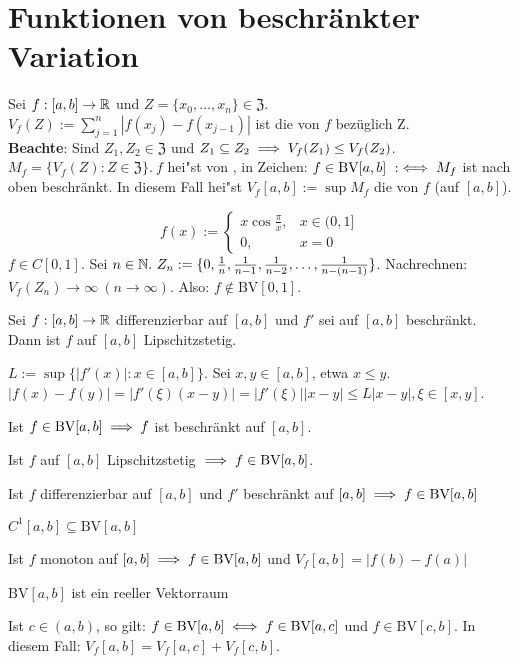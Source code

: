 \documentclass[a4paper,oneside,DIV15,BCOR12mm]{scrbook}
\begin{document}
\def\Z{\ensuremath{\mathfrak{Z}}}
\def\hin{\item["`$\Rightarrow$"':]}
\def\zurueck{\item["`$\Leftarrow$"':]}
\def\BV{\text{BV}}
\def\dx{\text{d}x}

\chapter{Funktionen von beschränkter Variation}

\begin{definition}
Sei $f:[a,b]\to\mathbb{R}$ und $Z=\{x_0,\ldots,x_n\} \in\Z$. $V_f(Z):=\sum_{j=1}^n|f(x_j)-f(x_{j-1})|$ ist die  von $f$ bezüglich Z.\\
\textbf{Beachte}: Sind $Z_1,Z_2 \in \Z$ und $Z_1 \subseteq Z_2\implies V_f(Z_1) \le V_f(Z_2)$. $M_f=\{V_f(Z):Z \in \Z\}.\ f$ hei"st von , in Zeichen: $f\in\BV[a,b]\ :\equizu M_f$ ist nach oben beschränkt. In diesem Fall hei"st $V_f[a,b]:=\sup M_f$ die  von $f$ (auf $[a,b]$). 
\end{definition}

\begin{beispiel}
$$f(x) := \begin{cases}
x\cos\frac{\pi}{x},&x \in (0,1]\\
0,&x=0\end{cases}$$
$f \in C[0,1]$. Sei $n\in\MdN.\ Z_n:=\{0,\frac{1}{n},\frac{1}{n-1},\frac{1}{n-2},\ldots,\frac{1}{n-(n-1)}\}$. Nachrechnen: $V_f(Z_n)\to\infty\ (n\to\infty)$. Also: $f \notin \BV[0,1]$.
\end{beispiel}

\begin{hilfssatz}
Sei $f:[a,b]\to\mathbb{R}$ differenzierbar auf $[a,b]$ und $f'$ sei auf $[a,b]$ beschränkt. Dann ist $f$ auf $[a,b]$ Lipschitzstetig.
\end{hilfssatz}

\begin{beweis}
$L:=\sup\{|f'(x)|:x\in[a,b]\}$. Sei $x,y\in[a,b]$, etwa $x\le y$. $|f(x)-f(y)|=|f'(\xi)(x-y)|=|f'(\xi)||x-y|\le L|x-y|,\xi \in [x,y]$.
\end{beweis}

\begin{satz}[Varianzeigenschaften]
\begin{liste}
\item Ist $f \in\BV[a,b]\folgt f$ ist beschränkt auf $[a,b]$.
\item Ist $f$ auf $[a,b]$ Lipschitzstetig $\folgt f\in\BV[a,b]$.
\item Ist $f$ differenzierbar auf $[a,b]$ und $f'$ beschränkt auf $[a,b]\folgt f\in\BV[a,b]$
\item $C^1[a,b]\subseteq \BV[a,b]$
\item Ist $f$ monoton auf $[a,b]\folgt f\in\BV[a,b]$ und $V_f[a,b]=|f(b)-f(a)|$
\item $\BV[a,b]$ ist ein reeller Vektorraum
\item Ist $c \in (a,b)$, so gilt: $f\in\BV[a,b] \equizu f\in\BV[a,c]$ und $f\in\BV[c,b]$. In diesem Fall: $V_f[a,b]=V_f[a,c]+V_f[c,b]$.
\end{liste}
\end{satz}
\end{document}
